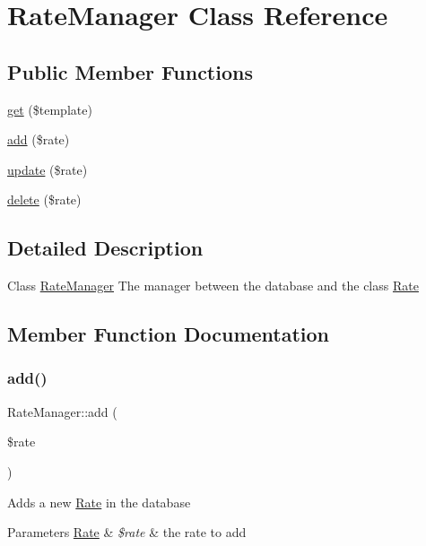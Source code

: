 \hypertarget{classRateManager}{}\section{Rate\+Manager Class Reference}
\label{classRateManager}
\subsection*{Public Member Functions}
\begin{DoxyCompactItemize}
\item 
\hyperlink{classRateManager_ad1c256b4d154cf02a5fda3cacb5efdc1}{get} (\$template)
\item 
\hyperlink{classRateManager_a0169913cc181de8eb5a0a90200ad8ba9}{add} (\$rate)
\item 
\hyperlink{classRateManager_a87dfbd80d02e6397d47aaf723f942eab}{update} (\$rate)
\item 
\hyperlink{classRateManager_afa1e5ece1eb0b57dcdc0bf73674b5a44}{delete} (\$rate)
\end{DoxyCompactItemize}


\subsection{Detailed Description}
Class \hyperlink{classRateManager}{Rate\+Manager} The manager between the database and the class \hyperlink{classRate}{Rate} 

\subsection{Member Function Documentation}
\mbox{\label{classRateManager_a0169913cc181de8eb5a0a90200ad8ba9}} 
\subsubsection{\texorpdfstring{add()}{add()}}
{\footnotesize\ttfamily Rate\+Manager\+::add (\begin{DoxyParamCaption}\item[{}]{\$rate }\end{DoxyParamCaption})}

Adds a new \hyperlink{classRate}{Rate} in the database 
\begin{DoxyParams}[1]{Parameters}
\hyperlink{classRate}{Rate} & {\em \$rate} & the rate to add \\
\hline
\end{DoxyParams}
\mbox{\label{classRateManager_afa1e5ece1eb0b57dcdc0bf73674b5a44}} 

